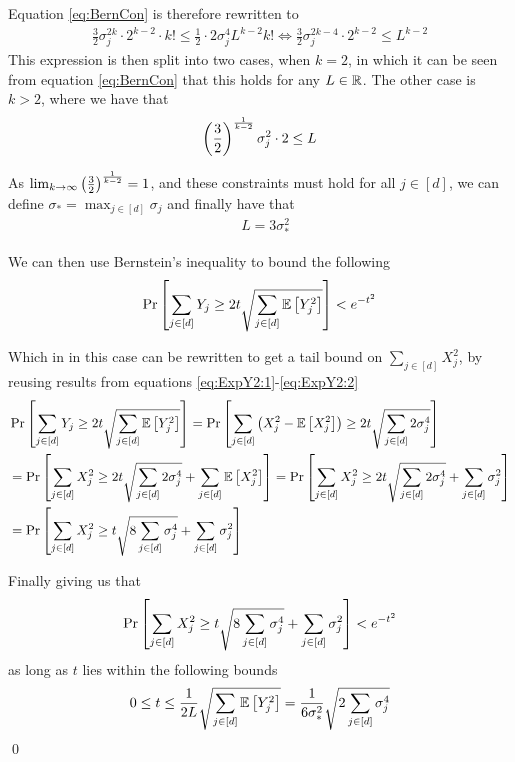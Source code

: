 \documentclass[a4paper,12pt]{article}
\renewenvironment{proof}{{\textit{Proof} \\}}{\qed}
\begin{document}
\begin{proof}
Equation \eqref{eq:BernCon} is therefore rewritten to 
\begin{align*}
    \frac{3}{2}\sigma_j^{2k} \cdot 2^{k-2} \cdot k! \le \frac{1}{2} \cdot 2 \sigma_j^4 L^{k-2} k! 
    \iff \frac{3}{2} \sigma_j^{2k-4} \cdot 2^{k-2} \le L^{k-2}
\end{align*}
This expression is then split into two cases, when $k=2$, in which it can be seen from equation \eqref{eq:BernCon} that this holds for any $L \in \mathbb{R}$.
The other case is $k>2$, where we have that 
\[
    \left (\frac{3}{2}\right)^{\frac{1}{k-2}} \sigma_j^2 \cdot 2 \le L
\]

As $\lim_{k \rightarrow \infty} \left (\frac{3}{2}\right)^{\frac{1}{k-2}} = 1$, 
and these constraints must hold for all $j \in [d]$, we can define $\sigma_* = \max_{j \in [d]} \sigma_j$ and finally have that
\begin{align*}
    &L = 3\sigma_*^2 
\end{align*}

We can then use Bernstein's inequality to bound the following 
\begin{equation}
\label{eq:BernIneq}
    \Pr\left [\sum_{j \in [d]} Y_j \ge 2 t \sqrt{ \sum_{j \in [d]} \mathbb{E} \left [ Y_j^2  \right]} \right] < e^{-t^2}
\end{equation}

Which in in this case can be rewritten to get a tail bound on $\sum_{j \in [d]} X_j^2$,
by reusing results from equations \eqref{eq:ExpY2:1}-\eqref{eq:ExpY2:2}
\begin{align*}
&\Pr\left [\sum_{j \in [d]} Y_j \ge 2 t \sqrt{ \sum_{j \in [d]} \mathbb{E} \left [ Y_j^2  \right]} \right] 
=\Pr\left [\sum_{j \in [d]} \left (X_j^2 - \mathbb{E} \left [ X_j^2  \right]\right) \ge 2 t \sqrt{ \sum_{j \in [d]} 2 \sigma_j^4} \right] \\
&=\Pr\left [\sum_{j \in [d]} X_j^2  \ge 2 t \sqrt{ \sum_{j \in [d]} 2 \sigma_j^4} + \sum_{j \in [d]} \mathbb{E} \left [ X_j^2  \right] \right] 
=\Pr\left [\sum_{j \in [d]} X_j^2  \ge 2 t \sqrt{ \sum_{j \in [d]} 2 \sigma_j^4} + \sum_{j \in [d]} \sigma_j^2 \right]  \\
&=\Pr\left [\sum_{j \in [d]} X_j^2  \ge 
    t \sqrt{ 8 \sum_{j \in [d]}  \sigma_j^4} +
    \sum_{j \in [d]} \sigma_j^2  \right] \\
\end{align*}

Finally giving us that 
\[
\Pr\left [\sum_{j \in [d]} X_j^2  \ge 
    t \sqrt{ 8 \sum_{j \in [d]}  \sigma_j^4} +
    \sum_{j \in [d]} \sigma_j^2  \right] < e^{-t^2}
\]
as long as $t$ lies within the following bounds
\[
    0 \le t \le \frac{1}{2L} \sqrt{\sum_{j \in [d]} \mathbb{E} \left [ Y_j^2  \right]} =
    \frac{1}{6 \sigma_*^2} \sqrt{2 \sum_{j \in [d]} \sigma_j^4}
\]
\end{proof}
\end{document}
